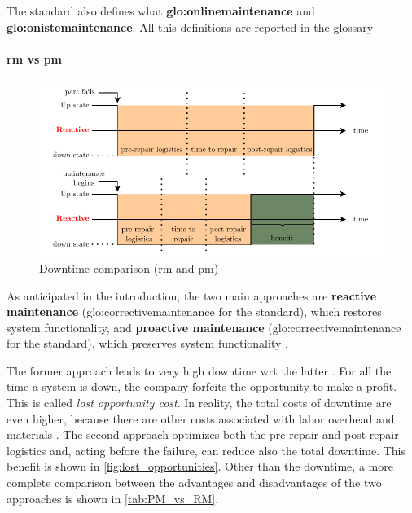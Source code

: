 The standard also defines what \textbf{\gls{glo:onlinemaintenance}} and \textbf{\gls{glo:onistemaintenance}}. All this definitions are reported in the {glossary}


\paragraph*{\gls{rm} vs \gls{pm}}
\begin{figure}
    \centering
    \includegraphics[scale=0.9]{images/StateArt/lost_opportunities.pdf}
    \caption{Downtime comparison (\gls{rm} and \gls{pm})}
    \label{fig:lost_opportunities}
\end{figure}

As anticipated in the introduction, the two main approaches are \textbf{reactive maintenance} (\gls{glo:correctivemaintenance} for the standard), which restores system functionality, and \textbf{proactive maintenance} (\gls{glo:correctivemaintenance} for the standard), which preserves system functionality \cite{Rely_maint_book}.

The former approach leads to very high downtime \gls{wrt} the latter \cite{NIST}. For all the time a system is down, the company forfeits the opportunity to make a profit. This is called \emph{lost opportunity cost}. In reality, the total costs of downtime are even higher, because there are other costs associated with labor overhead and materials \cite{Lost_Opport_Cost}. The second approach optimizes both the pre-repair and post-repair logistics and, acting before the failure, can reduce also the total downtime. This benefit is shown in \autoref{fig:lost_opportunities}. Other than the downtime, a more complete comparison between the advantages and disadvantages of the two approaches is shown in \autoref{tab:PM_vs_RM}.



